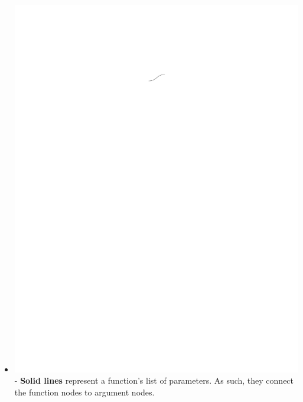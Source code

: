 \documentclass[conference]{IEEEtran}
\begin{document}
\begin{itemize}
		\item  \vspace{.25cm} \includegraphics{glossary-solidline} - \textbf{Solid
			lines} represent a function's list of parameters. As such, they
		connect the function nodes to argument nodes.
		

\end{itemize}
\end{document}
